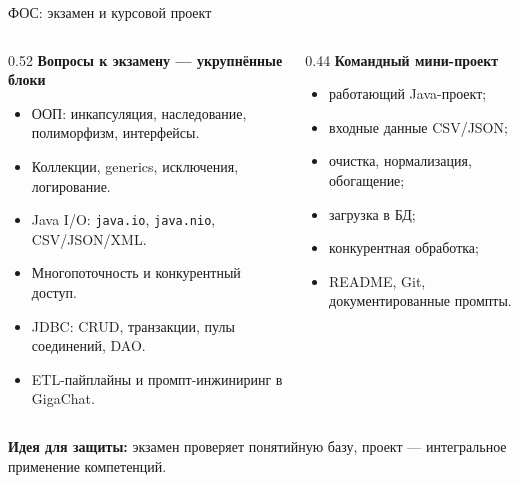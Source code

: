 \documentclass[aspectratio=169,10pt]{beamer}
\newcommand{\smallgap}{\vspace{0.35em}}
\begin{document}
\begin{frame}{ФОС: экзамен и курсовой проект}
\small
\begin{columns}[T,onlytextwidth]
\begin{column}{0.52\textwidth}
\textbf{Вопросы к экзамену — укрупнённые блоки}
\begin{itemize}
  \item ООП: инкапсуляция, наследование, полиморфизм, интерфейсы.
  \item Коллекции, generics, исключения, логирование.
  \item Java I/O: \texttt{java.io}, \texttt{java.nio}, CSV/JSON/XML.
  \item Многопоточность и конкурентный доступ.
  \item JDBC: CRUD, транзакции, пулы соединений, DAO.
  \item ETL-пайплайны и промпт-инжиниринг в GigaChat.
\end{itemize}
\end{column}
\begin{column}{0.44\textwidth}
\textbf{Командный мини-проект}
\begin{itemize}
  \item работающий Java-проект;
  \item входные данные CSV/JSON;
  \item очистка, нормализация, обогащение;
  \item загрузка в БД;
  \item конкурентная обработка;
  \item README, Git, документированные промпты.
\end{itemize}
\end{column}
\end{columns}
\smallgap
\textbf{Идея для защиты:} экзамен проверяет понятийную базу, проект — интегральное применение компетенций.
\end{frame}
\end{document}
